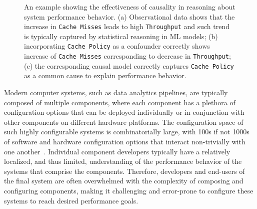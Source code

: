 \begin{figure}[tp!]
{\begin{minipage}[c][1\width]{
	   0.3\linewidth}
	\end{minipage}}
 \hfill	
\caption{\small{An example showing the effectiveness of causality in reasoning about system performance behavior. 
    (a)  Observational data shows that the increase in \texttt{Cache Misses} %
    leads to high \texttt{Throughput} and such trend is typically captured by statistical reasoning in ML models; (b) incorporating \texttt{Cache Policy} as a confounder correctly shows increase of \texttt{Cache Misses} corresponding to decrease in \texttt{Throughput}; (c) the corresponding causal model correctly captures \texttt{Cache Policy} as a common cause to explain performance behavior.}}
    \label{fig:intro_fig}
\end{figure}

Modern computer systems, such as data analytics pipelines, are typically composed of multiple components, where each component has a plethora of configuration options that can be deployed individually or in conjunction with other components on different hardware platforms. The configuration space of such highly configurable systems is combinatorially large, with 100s if not 1000s of software and hardware configuration options that interact non-trivially with one another~\cite{wang2018understanding,halin2019test,JC:MASCOTS16,velez2022study}. Individual component developers typically have a relatively localized, and thus limited, understanding of the performance behavior of the systems that comprise the components. Therefore, developers and end-users of the final system are often overwhelmed with the complexity of composing and configuring components, making it challenging and error-prone to configure these systems to reach desired performance goals.




